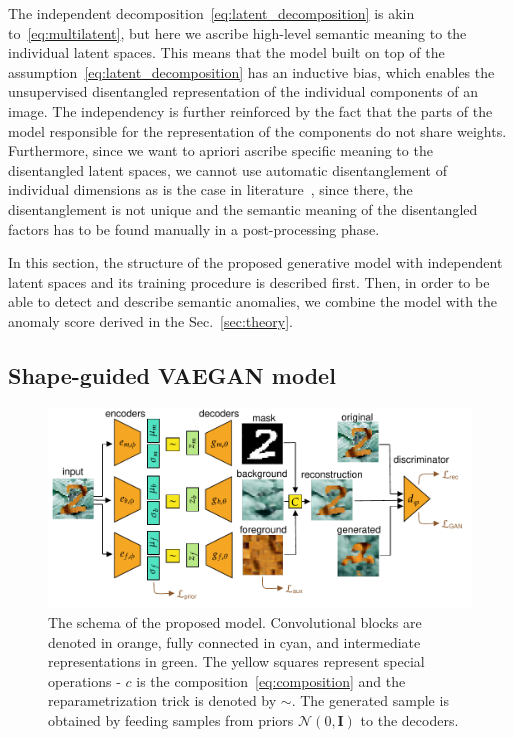 The independent decomposition~\eqref{eq:latent_decomposition} is akin to~\eqref{eq:multilatent}, but here we ascribe high-level semantic meaning to the individual latent spaces. This means that the model built on top of the assumption~\eqref{eq:latent_decomposition} has an inductive bias, which enables the unsupervised disentangled representation of the individual components of an image. The independency is further reinforced by the fact that the parts of the model responsible for the representation of the components do not share weights. Furthermore, since we want to apriori ascribe specific meaning to the disentangled latent spaces, we cannot use automatic disentanglement of individual dimensions as is the case in literature~\cite{burgess2018understanding, kim2019bayes, deecke2021transfer}, since there, the disentanglement is not unique and the semantic meaning of the disentangled factors has to be found manually in a post-processing phase.

In this section, the structure of the proposed generative model with independent latent spaces and its training procedure is described first. Then, in order to be able to detect and describe semantic anomalies, we combine the model with the anomaly score derived in the Sec.~\ref{sec:theory}.

\subsection{Shape-guided VAEGAN model} \label{sec:sgvaegan}
 \begin{figure}[ht]
    \centering
       \includegraphics[width=\textwidth]{data/chapter_sgvaegan/fig2_sgvaegan_losses.pdf}
    \caption{The schema of the proposed model. Convolutional blocks are denoted in orange, fully connected in cyan, and intermediate representations in green. The yellow squares represent special operations - $c$ is the composition~\eqref{eq:composition} and the reparametrization trick is denoted by $\sim$. The generated sample is obtained by feeding samples from priors $\mathcal{N}(0,\mathbf{I})$ to the decoders.}
    \label{fig:sgvaegan_schema}
\end{figure}

